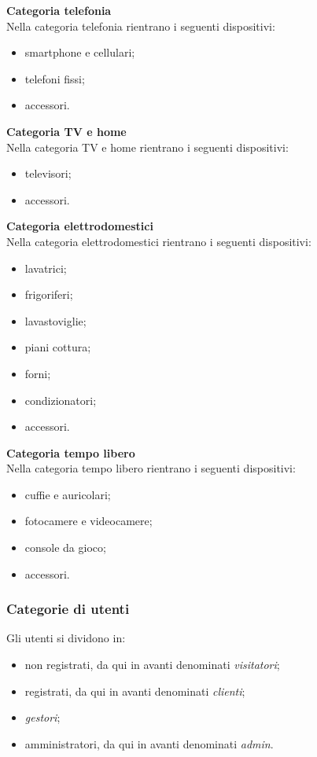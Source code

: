 \documentclass[a4paper, 14pt]{article}
\begin{document}
\begin{flushleft}
			\bigskip \textbf{Categoria telefonia} \\ \smallskip
			Nella categoria telefonia rientrano i seguenti dispositivi:
			\begin{itemize}
				\item smartphone e cellulari;
				\item telefoni fissi;
				\item accessori.
			\end{itemize}
				
			\bigskip \textbf{Categoria TV e home} \\ \smallskip
			Nella categoria TV e home rientrano i seguenti dispositivi:
			\begin{itemize}
				\item televisori;
				\item accessori.
			\end{itemize}
			
			\bigskip \textbf{Categoria elettrodomestici} \\ \smallskip
			Nella categoria elettrodomestici rientrano i seguenti dispositivi:
			\begin{itemize}
				\item lavatrici;
				\item frigoriferi;
				\item lavastoviglie;
				\item piani cottura;
				\item forni;
				\item condizionatori;
				\item accessori.
			\end{itemize}			
			
			\bigskip \textbf{Categoria tempo libero} \\ \smallskip
			Nella categoria tempo libero rientrano i seguenti dispositivi:
			\begin{itemize}
				\item cuffie e auricolari;
				\item fotocamere e videocamere;
				\item console da gioco;
				\item accessori.
			\end{itemize}			
			
			\subsubsection{Categorie di utenti} \label{CategorieUtenti}
			Gli utenti si dividono in:
			\begin{itemize}
				\item non registrati, da qui in avanti denominati \textit{visitatori};
				\item registrati, da qui in avanti denominati \textit{clienti};
				\item \textit{gestori};
				\item amministratori, da qui in avanti denominati \textit{admin}.
			\end{itemize}
			

\end{flushleft}
\end{document}
